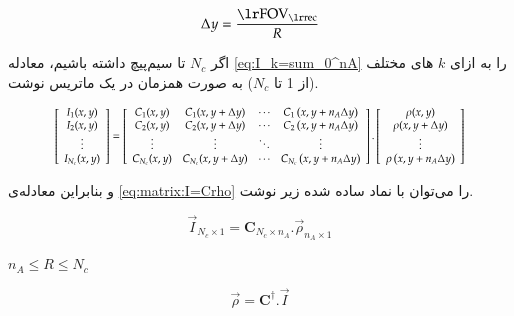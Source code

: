 \removevspace
\begin{equation}
	\Delta y = \dfrac{\lrtext{FOV}_{\lrtext{rec}}}{R}
\end{equation}

اگر $N_c$ تا سیم‌پیچ داشته باشیم، 
معادله \ref{eq:I_k=sum_0^nA}
را به ازای $k$ های مختلف (از 1 تا $N_c$)
به صورت همزمان در یک ماتریس نوشت.


\begin{equation}\label{eq:matrix:I=Crho}
	\rescaleequation{0.85}{
	\left[\begin{array}{c}
		I_1(x, y) \\
		I_2(x, y) \\
		\vdots \\
		I_{N_c}(x, y)
	\end{array}\right]
	=\left[\begin{array}{cccc}
		C_{1}(x, y) & C_{1}(x, y+\Delta y) & \cdots & C_{1}\left(x, y+n_{A} \Delta y\right) \\
		C_{2}(x, y) & C_{2}(x, y+\Delta y) & \cdots & C_{2}\left(x, y+n_{A} \Delta y\right) \\
		\vdots & \vdots & \ddots & \vdots \\
		C_{N_c}(x, y) & C_{N_c}(x, y+\Delta y) & \cdots & C_{N_c}\left(x, y+n_{A} \Delta y\right)
	\end{array}\right]
	.
	\left[\begin{array}{c}
		\rho(x, y) \\
		\rho(x, y+\Delta y) \\
		\vdots \\
		\rho\left(x, y+n_{A} \Delta y\right)
	\end{array}\right]}
\end{equation}

و بنابراین معادله‌ی 
\ref{eq:matrix:I=Crho}
را می‌توان با نماد ساده شده زیر نوشت.

\removevspace
\begin{equation}
	\vec{I}_{N_c\times1} = \mathbf{C}_{N_c \times n_A} . \vec{\rho}_{n_A\times1}
\end{equation}

$n_A \le R \le N_c$

\removevspace
\begin{equation}
	\vec{\rho} = \mathbf{C}^\dagger . \vec{I}
\end{equation}





















